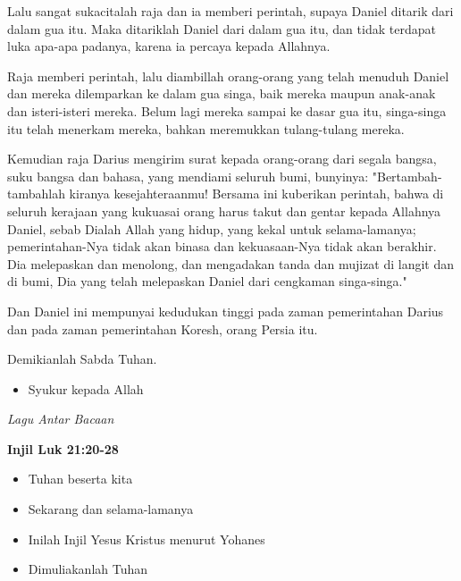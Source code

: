 \documentclass[a5paper,headsepline,titlepage,12pt,nnormalheadings,DIVcalc,twoside]{scrbook}
\makeatletter
\newcommand{\subjudul}[1]{%
  {\parindent \z@ 
    \interlinepenalty\@M \bfseries #1\par\nobreak \vskip 10\p@ }}
\newcommand{\lagu}[1]{%
  {\parindent \z@ 
    \interlinepenalty\@M \slshape \mdseries \Large \textit{#1}\par\nobreak \vskip 10\p@ }}
\newcommand{\BU}[1]{\begin{itemize} \item[U:] #1 \end{itemize}}
\newcommand{\BI}[1]{\begin{itemize} \item[I:] #1 \end{itemize}}
\makeatother
\begin{document}
{Lalu sangat sukacitalah raja dan ia memberi perintah, supaya Daniel ditarik dari dalam gua itu. Maka ditariklah Daniel dari dalam gua itu, dan tidak terdapat luka apa-apa padanya, karena ia percaya kepada Allahnya.

Raja memberi perintah, lalu diambillah orang-orang yang telah menuduh Daniel dan mereka dilemparkan ke dalam gua singa, baik mereka maupun anak-anak dan isteri-isteri mereka. Belum lagi mereka sampai ke dasar gua itu, singa-singa itu telah menerkam mereka, bahkan meremukkan tulang-tulang mereka.

Kemudian raja Darius mengirim surat kepada orang-orang dari segala bangsa, suku bangsa dan bahasa, yang mendiami seluruh bumi, bunyinya: "Bertambah-tambahlah kiranya kesejahteraanmu!
Bersama ini kuberikan perintah, bahwa di seluruh kerajaan yang kukuasai orang harus takut dan gentar kepada Allahnya Daniel, sebab Dialah Allah yang hidup, yang kekal untuk selama-lamanya; pemerintahan-Nya tidak akan binasa dan kekuasaan-Nya tidak akan berakhir.
Dia melepaskan dan menolong, dan mengadakan tanda dan mujizat di langit dan di bumi, Dia yang telah melepaskan Daniel dari cengkaman singa-singa."

Dan Daniel ini mempunyai kedudukan tinggi pada zaman pemerintahan Darius dan pada zaman pemerintahan Koresh, orang Persia itu.

Demikianlah Sabda Tuhan.}

\BU{Syukur kepada Allah}

 

\lagu{Lagu Antar Bacaan}



\subjudul{Injil Luk 21:20-28}

\BI{Tuhan beserta kita}

\BU{Sekarang dan selama-lamanya} 

\BI{Inilah Injil Yesus Kristus menurut Yohanes}

\BU{Dimuliakanlah Tuhan}
\end{document}
